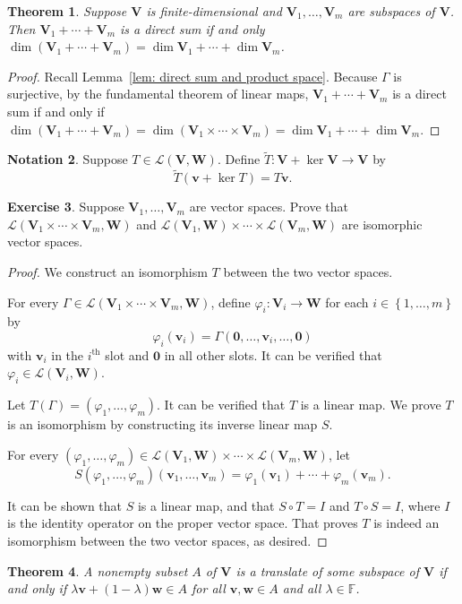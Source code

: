 \documentclass{tufte-handout}
\def \v {\vspace{0.2cm}}
\theoremstyle{plain} %
\newtheorem{thm}{Theorem}
\theoremstyle{definition}
\newtheorem{notn}[thm]{Notation}
\newtheorem{exer}[thm]{Exercise}
\theoremstyle{remark}
\newcommand{\bra}[1]{\mathopen{}\left(#1\right)}
\newcommand{\cbra}[1]{\mathopen{}\left\{#1\right\}}
\renewcommand{\phi}{\varphi}
\newcommand{\F}{\mathbb{F}}
\newcommand{\mL}{\mathcal{L}}
\newcommand{\zero}{\mathbf{0}}
\newcommand{\V}{\bm{V}}
\newcommand{\W}{\bm{W}}
\renewcommand{\v}{\bm{v}}
\newcommand{\w}{\bm{w}}
\begin{document}
\begin{thm}
	Suppose $\V$ is finite-dimensional and $\V_1,\dots,\V_m$ are subspaces of $\V$. Then $\V_1+\cdots+\V_m$ is a direct sum if and only $\dim\bra{\V_1+\cdots+\V_m} = \dim\V_1+\cdots+\dim\V_m$.
\end{thm}
\begin{proof}
	Recall Lemma~\ref{lem: direct sum and product space}. Because $\Gamma$ is surjective, by the fundamental theorem of linear maps, $\V_1+\cdots+\V_m$ is a direct sum if and only if $\dim\bra{\V_1+\cdots+\V_m} = \dim\bra{\V_1\times\cdots\times\V_m} = \dim\V_1+\cdots+\dim\V_m$.
\end{proof}

\begin{notn}
	Suppose $T\in\mL\bra{\V,\W}$. Define $\tilde{T}: \V+\ker\V \to \V$ by
	\[\tilde{T}\bra{\v+\ker T}=T\v.\]
\end{notn}

\begin{exer}
	Suppose $\V_1,\dots,\V_m$ are vector spaces. Prove that $\mL\bra{\V_1\times\cdots\times\V_m,\W}$ and $\mL\bra{\V_1,\W}\times\cdots\times\mL\bra{\V_m,\W}$ are isomorphic vector spaces. 
\end{exer}
\begin{proof}
	We construct an isomorphism $T$ between the two vector spaces.
	
	For every $\Gamma\in\mL\bra{\V_1\times\cdots\times\V_m,\W}$, define $\phi_i:\V_i\to\W$ for each $i\in\cbra{1,\dots,m}$ by
	\[\phi_i\bra{\v_i}=\Gamma\bra{\zero,\dots,\v_i,\dots,\zero}\]
	with $\v_i$ in the $i^\text{th}$ slot and $\zero$ in all other slots. It can be verified that $\phi_i\in\mL\bra{\V_i,\W}$.

	Let $T\bra{\Gamma}=\bra{\phi_1,\dots,\phi_m}$. It can be verified that $T$ is a linear map. We prove $T$ is an isomorphism by constructing its inverse linear map $S$.

	For every $\bra{\phi_1,\dots,\phi_m}\in\mL\bra{\V_1,\W}\times\cdots\times\mL\bra{\V_m,\W}$, let
	\[S\bra{\phi_1,\dots,\phi_m}\bra{\v_1,\dots,\v_m}=\phi_1\bra{\v_1}+\cdots+\phi_m\bra{\v_m}.\]
	
	It can be shown that $S$ is a linear map, and that $S\circ T=I$ and $T\circ S=I$, where $I$ is the identity operator on the proper vector space. That proves $T$ is indeed an isomorphism between the two vector spaces, as desired.
\end{proof}

\begin{thm}\label{thm: test for translate}
	A nonempty subset $A$ of $\V$ is a translate of some subspace of $\V$ if and only if $\lambda\v+\bra{1-\lambda}\w\in A$ for all $\v,\w\in A$ and all $\lambda\in\F$.
\end{thm}
\end{document}
